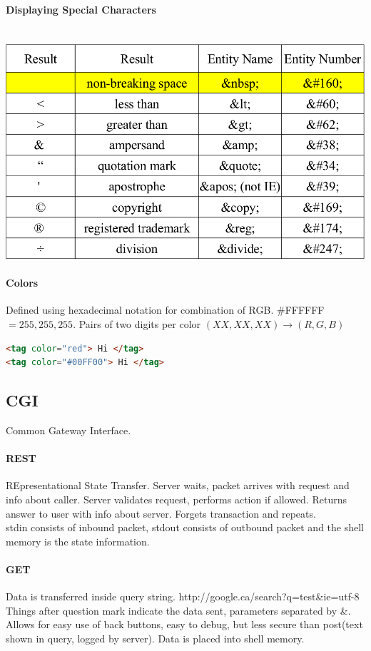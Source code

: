 \documentclass[12 pt]{article}
\begin{document}
\paragraph{Displaying Special Characters}
~\\\includegraphics[scale=0.4]{hte}
\paragraph{Colors} Defined using hexadecimal notation for combination of RGB. \#FFFFFF $ = 255,255,255$. Pairs of two digits per color $(XX,XX,XX)\to(R,G,B)$
\begin{lstlisting}[language=html]
<tag color="red"> Hi </tag>
<tag color="#00FF00"> Hi </tag>
\end{lstlisting}
\subsection{CGI}Common Gateway Interface.
\paragraph{REST}REpresentational State Transfer. Server waits, packet arrives with request and info about caller. Server validates request, performs action if allowed. Returns answer to user with info about server. Forgets transaction and repeats.
\\stdin consists of inbound packet, stdout consists of outbound packet and the shell memory is the state information.
\paragraph{GET} Data is transferred inside query string. http://google.ca/search?q=test\&ie=utf-8
\\ Things after question mark indicate the data sent, parameters separated by \&. Allows for easy use of back buttons, easy to debug, but less secure than post(text shown in query, logged by server). Data is placed into shell memory.
\end{document}
